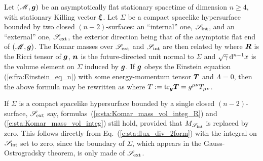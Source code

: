 \begin{prop}
\label{p:sta:Komar_mass_vol_integ}
Let $(\mathscr{M}, \bm{g})$ be an asymptotically flat stationary spacetime of dimension $n\geq 4$,
with stationary Killing vector $\bm{\xi}$.
Let $\Sigma$ be a compact spacelike hypersurface bounded by two closed $(n-2)$-surfaces:
an ``internal'' one, $\mathscr{S}_{\rm int}$, and an ``external'' one,
$\mathscr{S}_{\rm ext}$, the exterior direction being that of the asymptotic flat end of $(\mathscr{M}, \bm{g})$.
The Komar masses over $\mathscr{S}_{\rm ext}$ and $\mathscr{S}_{\rm int}$ are then
related by
\be \label{e:sta:Komar_mass_vol_integ_R}
\ee
where $\bm{R}$ is the Ricci tensor of $\bm{g}$,
$\bm{n}$ is the future-directed unit normal to $\Sigma$
and $\sqrt{\gamma}\,\mathrm{d}^{n-1} x$ is the volume element on $\Sigma$
induced by $\bm{g}$.
If $\bm{g}$ obeys the Einstein equation (\ref{e:fra:Einstein_eq_n}) with some energy-momentum
tensor $\bm{T}$ and $\Lambda=0$, then
the above formula may be rewritten as
\be \label{e:sta:Komar_mass_vol_integ}
\ee
where $T:= \mathrm{tr}_{\bm{g}} \bm{T} = g^{\mu\nu} T_{\mu\nu}$.
\end{prop}

\begin{remark}
\label{r:sta:Komar_mass_single_boundary}
If $\Sigma$ is a compact spacelike hypersurface bounded by a single closed
$(n-2)$-surface, $\mathscr{S}_{\rm ext}$ say, formulas~(\ref{e:sta:Komar_mass_vol_integ_R}) and (\ref{e:sta:Komar_mass_vol_integ})
still hold, provided that $M_{\mathscr{S}_{\rm int}}$ is replaced by zero. This follows
directly from Eq.~(\ref{e:sta:flux_div_2form}) with the integral on $\mathscr{S}_{\rm int}$
set to zero, since the boundary of $\Sigma$, which appears in the
Gauss-Ostrogradsky theorem, is only made of $\mathscr{S}_{\rm ext}$.
\end{remark}

